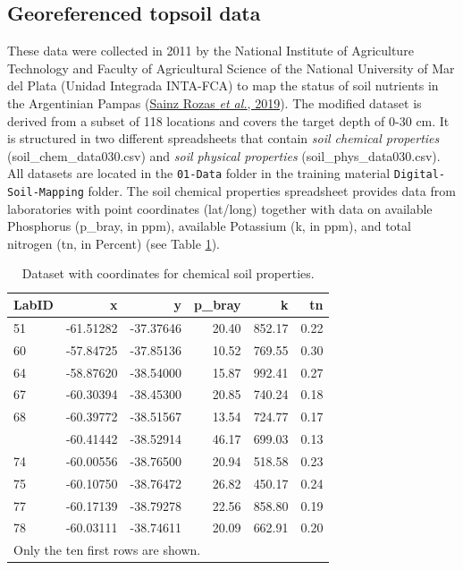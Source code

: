 \documentclass[
  10pt,
  b5paper,
  oneside]{book}
\begin{document}
\hypertarget{georeferenced-topsoil-data}{%
\subsection{Georeferenced topsoil data}\label{georeferenced-topsoil-data}}

These data were collected in 2011 by the National Institute of Agriculture Technology and Faculty of Agricultural Science of the National University of Mar del Plata (Unidad Integrada INTA-FCA) to map the status of soil nutrients in the Argentinian Pampas (\protect\hyperlink{ref-sainz2019}{Sainz Rozas \emph{et al.}, 2019}). The modified dataset is derived from a subset of 118 locations and covers the target depth of 0-30 cm. It is structured in two different spreadsheets that contain \emph{soil chemical properties} (soil\_chem\_data030.csv) and \emph{soil physical properties} (soil\_phys\_data030.csv). All datasets are located in the \texttt{01-Data} folder in the training material \texttt{Digital-Soil-Mapping} folder.
The soil chemical properties spreadsheet provides data from laboratories with point coordinates (lat/long) together with data on available Phosphorus (p\_bray, in ppm), available Potassium (k, in ppm), and total nitrogen (tn, in Percent) (see Table \ref{tab:table2}).

\begin{table}

\caption{\label{tab:table2}Dataset with coordinates for chemical soil properties.}
\centering
\begin{tabular}[t]{lrrrrr}
\toprule
LabID & x & y & p\_bray & k & tn\\
\midrule
51 & -61.51282 & -37.37646 & 20.40 & 852.17 & 0.22\\
60 & -57.84725 & -37.85136 & 10.52 & 769.55 & 0.30\\
64 & -58.87620 & -38.54000 & 15.87 & 992.41 & 0.27\\
67 & -60.30394 & -38.45300 & 20.85 & 740.24 & 0.18\\
68 & -60.39772 & -38.51567 & 13.54 & 724.77 & 0.17\\
\addlinespace
69 & -60.41442 & -38.52914 & 46.17 & 699.03 & 0.13\\
74 & -60.00556 & -38.76500 & 20.94 & 518.58 & 0.23\\
75 & -60.10750 & -38.76472 & 26.82 & 450.17 & 0.24\\
77 & -60.17139 & -38.79278 & 22.56 & 858.80 & 0.19\\
78 & -60.03111 & -38.74611 & 20.09 & 662.91 & 0.20\\
\bottomrule
\multicolumn{6}{l}{\rule{0pt}{1em}Only the ten first rows are shown.}\\
\end{tabular}
\end{table}
\end{document}
